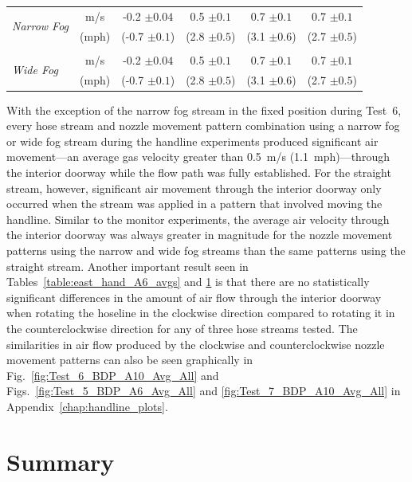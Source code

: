 \documentclass[12pt,oneside]{book}
\begin{document}
\begin{table}[!ht]
\begin{tabular}{lccccc}
\multirow{2}{*}{\textit{Narrow Fog}} & 
\small{m/s}   &  -0.2 $\pm0.04$   &   0.5 $\pm0.1$  &   0.7 $\pm0.1$   &  0.7 $\pm0.1$  \\ & 
\small{(mph)} &  (-0.7 $\pm0.1$)  &  (2.8 $\pm0.5$) &  (3.1 $\pm0.6$)  & (2.7 $\pm0.5$)
\\ \multicolumn{6}{c}{} \\
\multirow{2}{*}{\textit{Wide Fog}} & 
\small{m/s}   &  -0.2 $\pm0.04$   &   0.5 $\pm0.1$  &   0.7 $\pm0.1$   &  0.7 $\pm0.1$  \\ & 
\small{(mph)} &  (-0.7 $\pm0.1$)  &  (2.8 $\pm0.5$) &  (3.1 $\pm0.6$)  & (2.7 $\pm0.5$)
\\ \bottomrule
\end{tabular}
\label{table:west_hand_A10_avgs}
\end{table}
\FloatBarrier

With the exception of the narrow fog stream in the fixed position during Test~6, every hose stream and nozzle movement pattern combination using a narrow fog or wide fog stream during the handline experiments produced significant air movement---an average gas velocity greater than 0.5~m/s (1.1~mph)---through the interior doorway while the flow path was fully established. For the straight stream, however, significant air movement through the interior doorway only occurred when the stream was applied in a pattern that involved moving the handline. Similar to the monitor experiments, the average air velocity through the interior doorway was always greater in magnitude for the nozzle movement patterns using the narrow and wide fog streams than the same patterns using the straight stream. Another important result seen in Tables~\ref{table:east_hand_A6_avgs} and \ref{table:west_hand_A10_avgs} is that there are no statistically significant differences in the amount of air flow through the interior doorway when rotating the hoseline in the clockwise direction compared to rotating it in the counterclockwise direction for any of three hose streams tested. The similarities in air flow produced by the clockwise and counterclockwise nozzle movement patterns can also be seen graphically in Fig.~\ref{fig:Test_6_BDP_A10_Avg_All} and Figs.~\ref{fig:Test_5_BDP_A6_Avg_All} and \ref{fig:Test_7_BDP_A10_Avg_All} in Appendix~\ref{chap:handline_plots}. 


\chapter{Summary}
\label{chap:summary}
\end{document}
